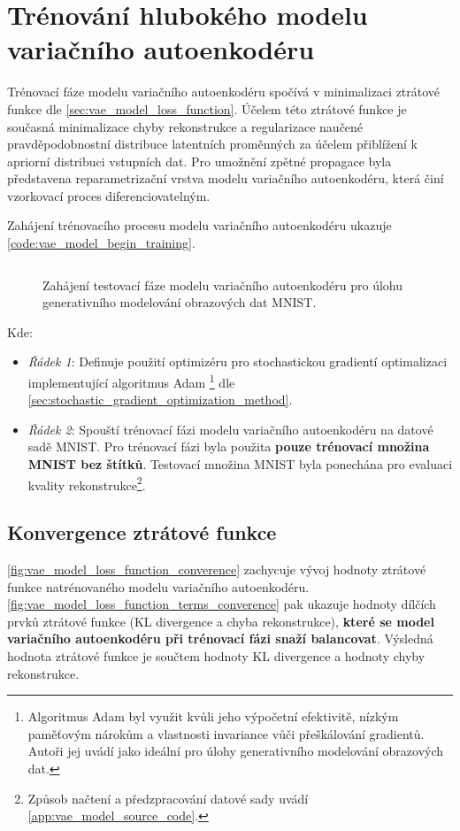 \newpage
\section{Trénování hlubokého modelu variačního autoenkodéru}
Trénovací fáze modelu variačního autoenkodéru spočívá v minimalizaci ztrátové funkce dle \autoref{sec:vae_model_loss_function}.
Účelem této ztrátové funkce je současná minimalizace chyby rekonstrukce a regularizace naučené pravděpodobnostní distribuce latentních proměnných za účelem přiblížení k apriorní distribuci vstupních dat.
Pro umožnění zpětné propagace byla představena reparametrizační vrstva modelu variačního autoenkodéru, která činí vzorkovací proces diferenciovatelným.

Zahájení trénovacího procesu modelu variačního autoenkodéru ukazuje \autoref{code:vae_model_begin_training}. 

\begin{figure}[H]
    \inputminted[linenos]{python}{code_snippets/vae_train.py}
    \caption{Zahájení testovací fáze modelu variačního autoenkodéru pro úlohu generativního modelování obrazových dat MNIST.}
    \label{code:vae_model_begin_training}
\end{figure}

Kde:
\begin{itemize}
    \item \emph{Řádek 1}: Definuje použití optimizéru pro stochastickou gradientí optimalizaci implementující algoritmus Adam \cite{Kingma2017} \footnote{Algoritmus Adam byl využit kvůli jeho výpočetní efektivitě, nízkým paměťovým nárokům a vlastnosti invariance vůči přeškálování gradientů. Autoři \textcite{Kingma2017} jej uvádí jako ideální pro úlohy generativního modelování obrazových dat.} dle \autoref{sec:stochastic_gradient_optimization_method}.
    \item \emph{Řádek 2}: Spouští trénovací fázi modelu variačního autoenkodéru na datové sadě MNIST. Pro trénovací fázi byla použita \textbf{pouze trénovací množina MNIST bez štítků}. Testovací množina MNIST byla ponechána pro evaluaci kvality rekonstrukce\footnote{Způsob načtení a předzpracování datové sady uvádí \autoref{app:vae_model_source_code}.}.
\end{itemize}

\newpage
\subsection{Konvergence ztrátové funkce}
\autoref{fig:vae_model_loss_function_converence} zachycuje vývoj hodnoty ztrátové funkce natrénovaného modelu variačního autoenkodéru.
\autoref{fig:vae_model_loss_function_terms_converence} pak ukazuje hodnoty dílčích prvků ztrátové funkce (KL divergence a chyba rekonstrukce), \textbf{které se model variačního autoenkodéru při trénovací fázi snaží balancovat}.
Výsledná hodnota ztrátové funkce je součtem hodnoty KL divergence a hodnoty chyby rekonstrukce.

